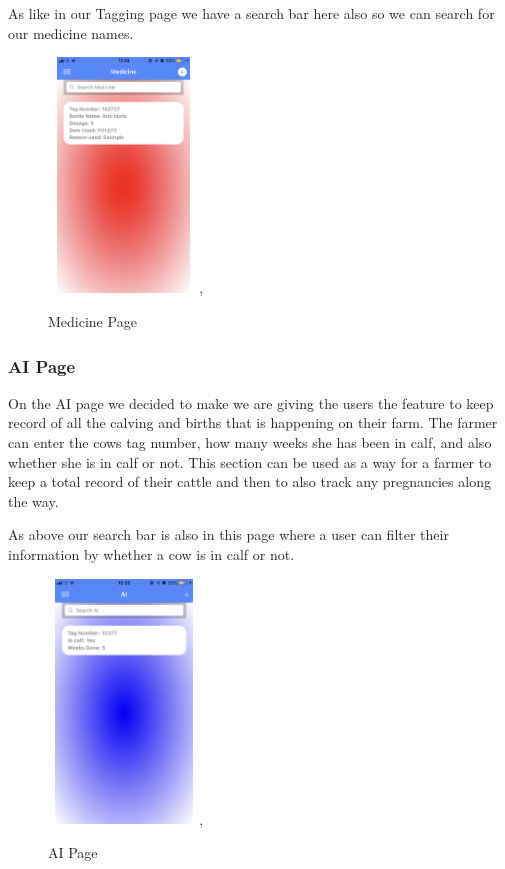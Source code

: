 \documentclass[12pt,a4paper,oneside,openany]{book}
\begin{document}
As like in our Tagging page we have a search bar here also so we can search for our medicine names.

\begin{figure}[ht]
\renewcommand\thefigure{5.14}
\centering
\includegraphics[width=4cm,height=6.25cm]{Images/medicine.png},
\caption{Medicine Page}
\label{medicine}
\end{figure}

\newpage

\subsubsection{AI Page}
On the AI page we decided to make we are giving the users the feature to keep record of all the calving and births that is happening on their farm. The farmer can enter the cows tag number, how many weeks she has been in calf, and also whether she is in calf or not. This section can be used as a way for a farmer to keep a total record of their cattle and then to also track any pregnancies along the way.

As above our search bar is also in this page where a user can filter their information by whether a cow is in calf or not.

\begin{figure}[ht]
\renewcommand\thefigure{5.15}
\centering
\includegraphics[width=4cm,height=6.5cm]{Images/AI.png},
\caption{AI Page}
\label{AI}
\end{figure}
\end{document}
